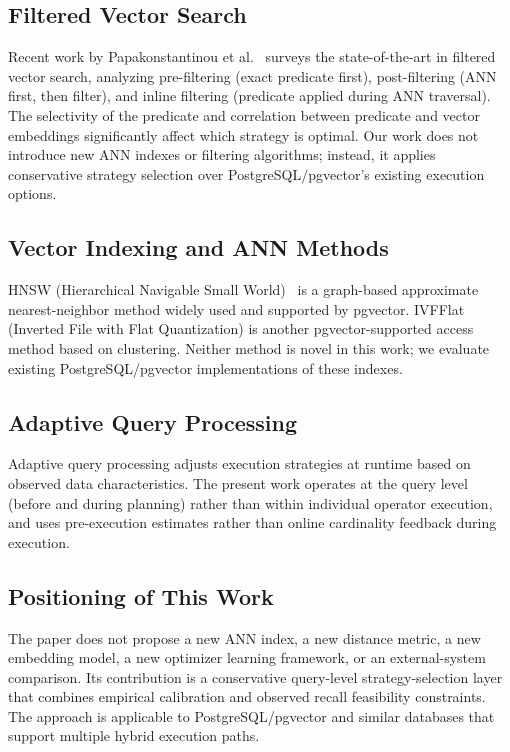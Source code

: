 \documentclass[10pt,twocolumn]{article}
\begin{document}
\subsection{Filtered Vector Search}

Recent work by Papakonstantinou et al.~\cite{filtered_vector_search} surveys the state-of-the-art in filtered vector search, analyzing pre-filtering (exact predicate first), post-filtering (ANN first, then filter), and inline filtering (predicate applied during ANN traversal). The selectivity of the predicate and correlation between predicate and vector embeddings significantly affect which strategy is optimal. Our work does not introduce new ANN indexes or filtering algorithms; instead, it applies conservative strategy selection over PostgreSQL/pgvector's existing execution options.

\subsection{Vector Indexing and ANN Methods}

HNSW (Hierarchical Navigable Small World)~\cite{malkov2020hnsw} is a graph-based approximate nearest-neighbor method widely used and supported by pgvector. IVFFlat (Inverted File with Flat Quantization) is another pgvector-supported access method based on clustering. Neither method is novel in this work; we evaluate existing PostgreSQL/pgvector implementations of these indexes.

\subsection{Adaptive Query Processing}

Adaptive query processing adjusts execution strategies at runtime based on observed data characteristics. The present work operates at the query level (before and during planning) rather than within individual operator execution, and uses pre-execution estimates rather than online cardinality feedback during execution.

\subsection{Positioning of This Work}

The paper does not propose a new ANN index, a new distance metric, a new embedding model, a new optimizer learning framework, or an external-system comparison. Its contribution is a conservative query-level strategy-selection layer that combines empirical calibration and observed recall feasibility constraints. The approach is applicable to PostgreSQL/pgvector and similar databases that support multiple hybrid execution paths.
\end{document}
